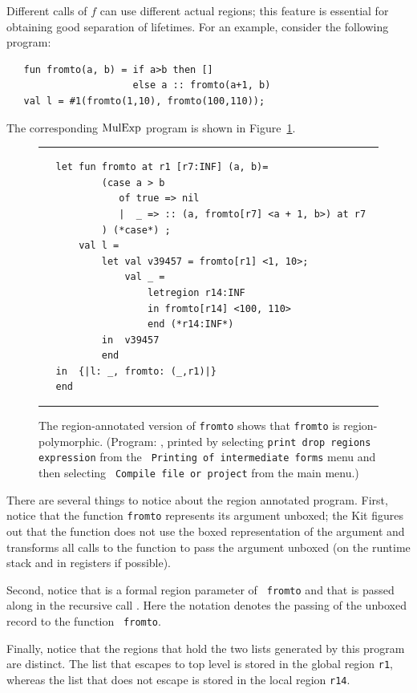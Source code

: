 \documentclass[12pt]{book}
\begin{document}
Different calls of $f$ can use different actual regions; this feature
is essential for obtaining good separation of lifetimes.  For an
example, consider the following program:
\begin{verbatim}
   fun fromto(a, b) = if a>b then []
                      else a :: fromto(a+1, b)
   val l = #1(fromto(1,10), fromto(100,110));
\end{verbatim}
The corresponding $\hbox{\rm MulExp}$ program is shown in
Figure~\ref{fromto.fig}.
\begin{figure}[htb]
\hrule
\medskip
\begin{verbatim}
   let fun fromto at r1 [r7:INF] (a, b)= 
           (case a > b 
              of true => nil
              |  _ => :: (a, fromto[r7] <a + 1, b>) at r7
           ) (*case*) ; 
       val l = 
           let val v39457 = fromto[r1] <1, 10>; 
               val _ = 
                   letregion r14:INF 
                   in fromto[r14] <100, 110> 
                   end (*r14:INF*)
           in  v39457
           end 
   in  {|l: _, fromto: (_,r1)|}
   end 
\end{verbatim}
\caption{The region-annotated version of {\tt fromto} shows that {\tt fromto}
  is region-polymorphic. (Program: , printed
  by selecting {\tt print drop regions expression} from the {\tt
    Printing of intermediate forms} menu and then selecting {\tt
    Compile file or project} from the main menu.)}  \medskip

\hrule
\label{fromto.fig}
\end{figure}

There are several things to notice about the region annotated program.
First, notice that the function {\tt fromto} represents its argument
%
%
%
unboxed; the Kit figures out that the function does not
use the boxed representation of the argument and transforms all calls
to the function to pass the argument unboxed (on the runtime stack and
in registers if possible).

Second, notice that  is a formal region parameter of {\tt
  fromto} and that  is passed along in the recursive call
. Here the notation 
denotes the passing of the unboxed record to the function {\tt
  fromto}.

%
Finally, notice that the regions that hold the two lists generated by
this program are distinct.  The list that escapes to top level is
stored in the global region {\tt r1}, whereas the list that does not
escape is stored in the local region {\tt r14}.
\end{document}
